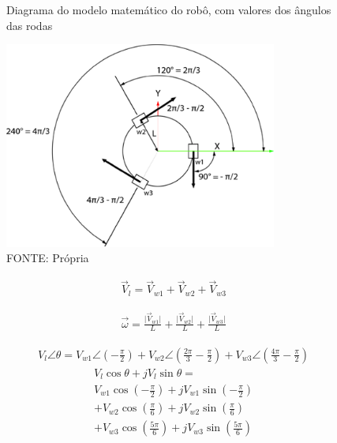 \begin{figure}[ht]
	\centering
	\caption{Diagrama do modelo matemático do robô, com valores dos ângulos das
	rodas}
	\includegraphics[width=0.8\textwidth]{figures/digram_model_dedution}
	\caption*{FONTE: Própria}
\end{figure}

\begin{equation}
    \begin{split}
        \overrightarrow{V}_{l} = 
        \overrightarrow{V}_{w1}
        + \overrightarrow{V}_{w2}
        + \overrightarrow{V}_{w3}
    \end{split}
\end{equation}

\begin{equation}
    \begin{split}
        \overrightarrow{\omega} = 
        \frac{\vert\overrightarrow{V}_{w1}\vert}{L}
        + \frac{\vert\overrightarrow{V}_{w2}\vert}{L}
        + \frac{\vert\overrightarrow{V}_{w3}\vert}{L}
    \end{split}
\end{equation}

\begin{gather*}
        V_{l} \angle \theta =  
        V_{w1} \angle \left(-\frac{\pi}{2}\right) 
        + V_{w2} \angle \left(\frac{2\pi}{3}-\frac{\pi}{2}\right) 
        + V_{w3} \angle \left(\frac{4\pi}{3}-\frac{\pi}{2}\right) 
\end{gather*}
\begin{gather*}
    V_{l} \cos{ \theta } + jV_{l} \sin{\theta} =  \\
    V_{w1} \cos{ \left(-\frac{\pi}{2}\right)} + jV_{w1} \sin{ \left(-\frac{\pi}{2}\right) } \\
    + V_{w2}  \cos{ \left(\frac{\pi}{6}\right) } + jV_{w2}  \sin{ \left(\frac{\pi}{6}\right) }  \\
    + V_{w3} \cos{ \left(\frac{5\pi}{6}\right) } + jV_{w3}  \sin{ \left(\frac{5\pi}{6}\right) } 
\end{gather*}


